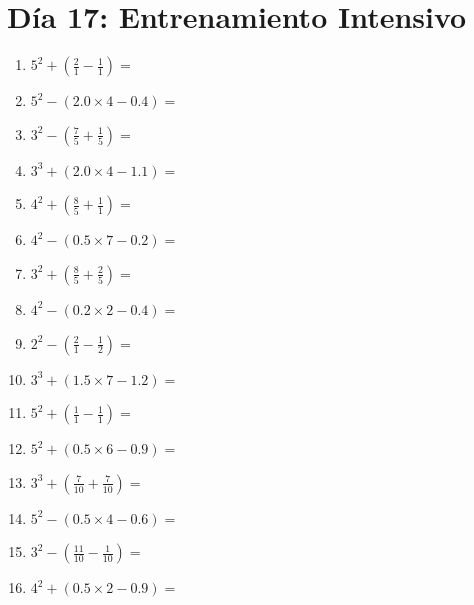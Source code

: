 \documentclass[12pt]{article}
\begin{document}
\section*{Día 17: Entrenamiento Intensivo}
\begin{enumerate}
\item \large $ 5^{2} + (\frac{2}{1} - \frac{1}{1}) = $ \vspace{1.6cm}
\item \large $ 5^{2} - (2.0 \times 4 - 0.4) = $ \vspace{1.6cm}
\item \large $ 3^{2} - (\frac{7}{5} + \frac{1}{5}) = $ \vspace{1.6cm}
\item \large $ 3^{3} + (2.0 \times 4 - 1.1) = $ \vspace{1.6cm}
\item \large $ 4^{2} + (\frac{8}{5} + \frac{1}{1}) = $ \vspace{1.6cm}
\item \large $ 4^{2} - (0.5 \times 7 - 0.2) = $ \vspace{1.6cm}
\item \large $ 3^{2} + (\frac{8}{5} + \frac{2}{5}) = $ \vspace{1.6cm}
\item \large $ 4^{2} - (0.2 \times 2 - 0.4) = $ \vspace{1.6cm}
\item \large $ 2^{2} - (\frac{2}{1} - \frac{1}{2}) = $ \vspace{1.6cm}
\item \large $ 3^{3} + (1.5 \times 7 - 1.2) = $ \vspace{1.6cm}
\newpage
\item \large $ 5^{2} + (\frac{1}{1} - \frac{1}{1}) = $ \vspace{1.6cm}
\item \large $ 5^{2} + (0.5 \times 6 - 0.9) = $ \vspace{1.6cm}
\item \large $ 3^{3} + (\frac{7}{10} + \frac{7}{10}) = $ \vspace{1.6cm}
\item \large $ 5^{2} - (0.5 \times 4 - 0.6) = $ \vspace{1.6cm}
\item \large $ 3^{2} - (\frac{11}{10} - \frac{1}{10}) = $ \vspace{1.6cm}
\item \large $ 4^{2} + (0.5 \times 2 - 0.9) = $ \vspace{1.6cm}

\end{enumerate}
\end{document}
